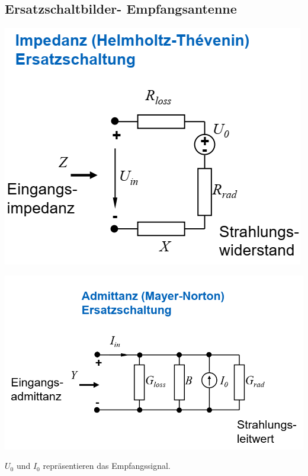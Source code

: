 \documentclass[english]{latex4ei/latex4ei_sheet}
\begin{document}
\begin{sectionbox}
    \subsection{Ersatzschaltbilder- Empfangsantenne}
    \includegraphics[width = \textwidth]{./img/antenne_empfang_ersatz.png}
\end{sectionbox}
\begin{sectionbox}

    \includegraphics[width = \textwidth]{./img/antenne_empfang_ersatz_02.png}


    $U_0$ und $I_0$ repräsentieren das Empfangssignal.
\end{sectionbox}
\end{document}
